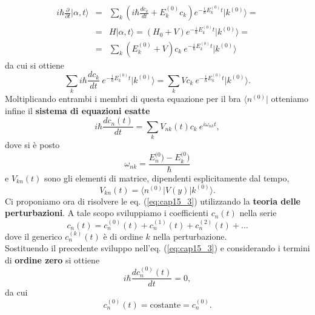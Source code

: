 \begin{eqnarray}
i\hbar \frac{\partial}{\partial t} \vert \alpha , t \rangle &=& \sum _ k \left( i\hbar \frac{dc_k}{dt}+ E_k ^{(0)} c_k\right)e^{-\frac{i}{\hbar}E_k ^{(0)} t } \vert k ^{(0)} \rangle = \nonumber \\
& = & H\vert \alpha , t \rangle  = \left( H_0 + V\right)e^{-\frac{i}{\hbar}E_k ^{(0)} t } \vert k ^{(0)} \rangle  =  \nonumber\\
& = &\sum _k \left( E_k ^{(0)}+ V\right)c_k\ e^{-\frac{i}{\hbar}E_k ^{(0)} t } \vert k ^{(0)} \rangle 
\end{eqnarray}
da cui si ottiene
\begin{equation}
\sum _ k i\hbar \frac{dc_k}{dt} \ e^{-\frac{i}{\hbar}E_k ^{(0)} t } \vert k ^{(0)} \rangle = \sum _ k V c_k\ e^{-\frac{i}{\hbar}E_k ^{(0)} t } \vert k ^{(0)} \rangle .
\end{equation}
Moltiplicando entrambi i membri di questa equazione per il bra $\langle n^{(0)} \vert$ otteniamo infine il \textbf{sistema di equazioni esatte}
\begin{equation}
i\hbar \frac{dc_n (t)}{dt} = \sum _ k V_{nk} (t) c_k\ e^{i\omega _{nk}t } ,
\label{eq:cap15_3}
\end{equation}
dove si è posto
\begin{equation}
\omega _{nk} = \frac{E_n ^{(0})-E_k ^{(0})}{\hbar}
\end{equation}
e $V_{kn} (t)$ sono gli elementi di matrice, dipendenti esplicitamente dal tempo,
\begin{equation}
V_{kn} (t) = \langle n ^{(0)} \vert V(y) \vert k ^{(0)} \rangle .
\end{equation}
Ci proponiamo ora di risolvere le eq. (\ref{eq:cap15_3}) utilizzando la \textbf{teoria delle perturbazioni}. A tale scopo sviluppiamo i coefficienti $c_n (t)$ nella serie
\begin{equation}
c_n (t) = c_n ^{(0)}(t)+c_n ^{(1)}(t)+c_n ^{(2)}(t)+\dots
\end{equation}
dove il generico $c_n ^{(k)}(t)$ è di ordine $k$ nella perturbazione.\\
Sostituendo il precedente sviluppo nell'eq. (\ref{eq:cap15_3}) e considerando i termini di \textbf{ordine zero} si ottiene
\begin{equation}
i\hbar \frac{d c_n ^{(0)}(t)}{dt}=0 ,
\end{equation}
da cui
\begin{equation}
c_n ^{(0)}(t) = \textrm{costante}= c_n ^{(0)} .
\label{eq:cap15_4}
\end{equation}
